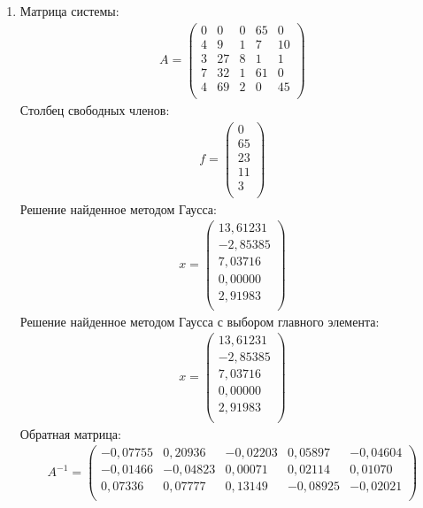 \documentclass[a4paper,12pt,titlepage,finall]{article}
\begin{document}
\begin{enumerate}
\item
Матрица системы:
\begin{align*}
A = \begin{pmatrix}
0&     0&     0&    65&     0 \\
   4&     9&     1&     7&    10 \\
   3&    27&     8&     1&     1 \\
   7&    32&     1&    61&     0 \\
   4&    69&     2&     0&    45 \\
\end{pmatrix}
\end{align*}
Столбец свободных членов:
\begin{align*}
f = \begin{pmatrix}
   0 \\
  65 \\
  23 \\
  11 \\
   3 \\
\end{pmatrix}
\end{align*}
Решение найденное методом Гаусса:
\begin{align*}
x = \begin{pmatrix}
13,61231 \\
  -2,85385 \\
   7,03716 \\
   0,00000 \\
   2,91983 \\
\end{pmatrix}
\end{align*}
Решение найденное методом Гаусса с выбором главного элемента:
\begin{align*}
x = \begin{pmatrix}
  13,61231 \\
  -2,85385 \\
   7,03716 \\
   0,00000 \\
   2,91983 \\
\end{pmatrix}
\end{align*}
Обратная матрица:
\begin{align*}
A^{-1} = \begin{pmatrix}
  -0,07755&     0,20936&    -0,02203&     0,05897&    -0,04604 \\
  -0,01466&    -0,04823&     0,00071&     0,02114&     0,01070 \\
   0,07336&     0,07777&     0,13149&    -0,08925&    -0,02021 \\

\end{pmatrix}
\end{align*}
\end{enumerate}
\end{document}
